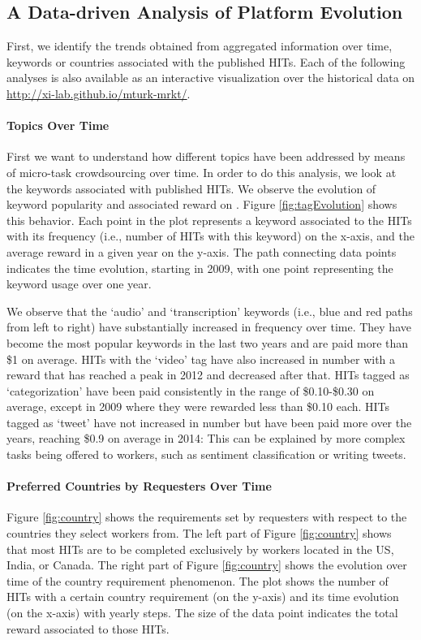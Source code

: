 \subsection{A Data-driven Analysis of Platform Evolution}
First, we identify the trends obtained from aggregated information over time, keywords or countries associated with the published HITs.  Each of the following analyses is also available as an interactive visualization over the historical data on \url{http://xi-lab.github.io/mturk-mrkt/}.
\paragraph{Topics  Over Time}
First we want to understand how different topics have been addressed by means of micro-task crowdsourcing over time.
In order to do this analysis, we look at the keywords associated with published HITs. We observe the evolution of keyword popularity and associated reward on \amt{}. 
Figure \ref{fig:tagEvolution} shows this behavior. Each point in the plot represents a keyword associated to the HITs with its frequency (i.e., number of HITs with this keyword) on the x-axis, and the average reward in a given year on the y-axis. The path connecting data points indicates the time evolution, starting in 2009, with one point representing the keyword usage over one year.

We observe that the `audio' and `transcription' keywords (i.e., blue and red paths from left to right) have substantially increased in frequency over time. They have become the most popular keywords in the last two years and are paid more than \$1 on average.
HITs with the `video' tag have also increased in number with a reward that has reached a peak in 2012 and decreased after that.
HITs tagged as `categorization' have been paid consistently in the range of \$0.10-\$0.30 on average, except in 2009 where they were rewarded less than \$0.10 each.
HITs tagged as `tweet' have not increased in number but have been paid more over the years, reaching \$0.9 on average in 2014: This can be explained by more complex tasks being offered to workers, such as sentiment classification or writing tweets.




\paragraph{Preferred Countries by Requesters Over Time}
Figure \ref{fig:country} shows the requirements set by requesters with respect to the countries they select workers from. The left part of Figure \ref{fig:country} shows that most HITs are to be completed exclusively by workers located in the US, India, or Canada. The right part of Figure \ref{fig:country} shows the evolution over time of the country requirement phenomenon.
The plot shows the number of HITs with a certain country requirement (on the y-axis) and its time evolution (on the x-axis) with yearly steps. The size of the data point indicates the total reward associated to those HITs.

